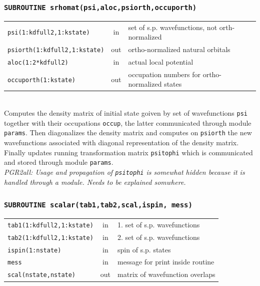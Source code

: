 \documentclass[final,1p]{elsarticle}
\newcommand{\PGRcomm}[1]{{\color{blue}\small\em PGR2all: #1}}
\begin{document}
\subsubsection*{\tt SUBROUTINE srhomat(psi,aloc,psiorth,occuporth)}
\begin{tabular}{lcl}
 {\tt psi(1:kdfull2,1:kstate)} & in & set of s.p. wavefunctions, not orth-normalized\\
 {\tt psiorth(1:kdfull2,1:kstate)} & out & ortho-normalized natural orbitals\\
 {\tt aloc(1:2*kdfull2)} & in & actual local potential\\
 {\tt occuporth(1:kstate)} & out & occupation numbers for
 ortho-normalized states\\
\end{tabular}
\\[4pt] Computes the density matrix of initial state goiven by set of
wavefunctions {\tt psi} together with their occupations {\tt occup},
the latter communicated through module {\tt params}.  Then
diagonalizes the density matrix and computes on {\tt psiorth} the new
wavefunctions associated with diagonal representation of the density
matrix.  
\\
Finally updates running transformation matrix {\tt psitophi} which is
communicated and stored through module {\tt params}.
\\
\PGRcomm{Usage and propagation of  {\tt psitophi} is somewhat hidden
  because it is handled through a module. Needs to be explained somwhere.}


\subsubsection*{\tt SUBROUTINE scalar(tab1,tab2,scal,ispin, mess)}
\begin{tabular}{lcl}
 {\tt tab1(1:kdfull2,1:kstate)} & in & 1. set of s.p. wavefunctions\\
 {\tt tab2(1:kdfull2,1:kstate)} & in & 2. set of s.p. wavefunctions\\
 {\tt ispin(1:nstate)} & in & spin of s.p. states\\
 {\tt mess} & in & message for print inside routine\\
 {\tt scal(nstate,nstate)} & out & matrix of wavefunction overlaps\\
\end{tabular}
\\[4pt]
\end{document}
